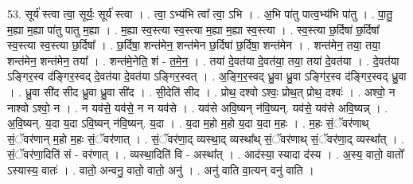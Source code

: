 \documentclass[17pt]{extarticle}
\begin{document}
53. सूर्य॑ स्त्वा त्वा॒ सूर्यः॒ सूर्य॑ स्त्वा । . त्वा॒ ऽभ्य॑भि त्वा᳚ त्वा॒ ऽभि । . अ॒भि पा॑तु पात्व॒भ्य॑भि पा॑तु । . पा॒तु॒ म॒ह्या म॒ह्या पा॑तु पातु म॒ह्या । . म॒ह्या स्व॒स्त्या स्व॒स्त्या म॒ह्या म॒ह्या स्व॒स्त्या । . स्व॒स्त्या छ॒र्दिषा॑ छ॒र्दिषा᳚ स्व॒स्त्या स्व॒स्त्या छ॒र्दिषा᳚ । . छ॒र्दिषा॒ शन्त॑मेन॒ शन्त॑मेन छ॒र्दिषा॑ छ॒र्दिषा॒ शन्त॑मेन । . शन्त॑मेन॒ तया॒ तया॒ शन्त॑मेन॒ शन्त॑मेन॒ तया᳚ । . शन्त॑मे॒नेति॒ शं - त॒मे॒न॒ । . तया॑ दे॒वत॑या दे॒वत॑या॒ तया॒ तया॑ दे॒वत॑या । . दे॒वत॑या ऽङ्गिर॒स्व द॑ङ्गिर॒स्वद् दे॒वत॑या दे॒वत॑या ऽङ्गिर॒स्वत् । . अ॒ङ्गि॒र॒स्वद् ध्रु॒वा ध्रु॒वा ऽङ्गि॑र॒स्व द॑ङ्गिर॒स्वद् ध्रु॒वा । . ध्रु॒वा सी॑द सीद ध्रु॒वा ध्रु॒वा सी॑द । . सी॒देति॑ सीद । . प्रोथ॒ दश्वो ऽश्वः॒ प्रोथ॒त् प्रोथ॒ दश्वः॑ । . अश्वो॒ न नाश्वो ऽश्वो॒ न । . न यव॑से॒ यव॑से॒ न न यव॑से । . यव॑से अवि॒ष्यन् न॑वि॒ष्यन्. यव॑से॒ यव॑से अवि॒ष्यन्न् । . अ॒वि॒ष्यन्. य॒दा य॒दा ऽवि॒ष्यन् न॑वि॒ष्यन्. य॒दा । . य॒दा म॒हो म॒हो य॒दा य॒दा म॒हः । . म॒हः सं॒ॅवर॑णाथ् सं॒ॅवर॑णान् म॒हो म॒हः सं॒ॅवर॑णात् । . सं॒ॅवर॑णा॒द् व्यस्था॒द् व्यस्था᳚थ् सं॒ॅवर॑णाथ् सं॒ॅवर॑णा॒द् व्यस्था᳚त् । . सं॒ॅवर॑णा॒दिति॑ सं - वर॑णात् । . व्यस्था॒दिति॑ वि - अस्था᳚त् । . आद॑स्या॒ स्यादा द॑स्य । . अ॒स्य॒ वातो॒ वातो᳚ ऽस्यास्य॒ वातः॑ । . वातो॒ अन्वनु॒ वातो॒ वातो॒ अनु॑ । . अनु॑ वाति वा॒त्यन् वनु॑ वाति । \newline
\end{document}
